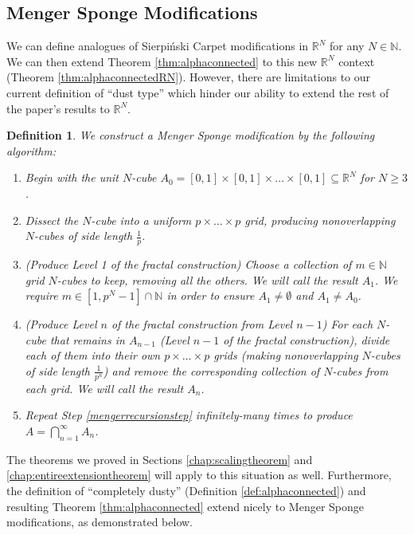 \documentclass{article}
\theoremstyle{plain}
\newtheorem{definition}{Definition}
\numberwithin{equation}{section}
\numberwithin{table}{section}
\numberwithin{figure}{section}
\newcommand{\vaddspace}[1]{\rule{0pt}{#1pt}}
\newcommand{\newparagraph}{\vaddspace{10}}
\begin{document}
\subsection{Menger Sponge Modifications} \label{chap:mengersponges}
We can define analogues of Sierpi\'nski Carpet modifications in $\mathbb{R}^N$ for any $N \in \mathbb{N}$. We can then extend Theorem \ref{thm:alphaconnected} to this new $\mathbb{R}^N$ context (Theorem \ref{thm:alphaconnectedRN}). However, there are limitations to our current definition of ``dust type'' which hinder our ability to extend the rest of the paper's results to $\mathbb{R}^N$.
\begin{definition}\label{def:mengerspongemodification}
We construct a \textit{Menger Sponge modification} by the following algorithm:
\begin{enumerate}
    \item Begin with the unit $N$-cube $A_0 = [0,1] \times [0,1] \times\dots\times [0,1] \subseteq \mathbb{R}^N$ for $N \geq 3$.
    \item Dissect the $N$-cube into a uniform $p \times\dots\times p$ grid, producing nonoverlapping $N$-cubes of side length $\frac{1}{p}$.
    \item (Produce Level 1 of the fractal construction) Choose a collection of $m \in \mathbb{N}$ grid $N$-cubes to keep, removing all the others. We will call the result $A_1$. We require $m \in [1,p^N-1] \cap \mathbb{N}$ in order to ensure $A_1 \neq \emptyset$ and $A_1 \neq A_0$.
    \item (Produce Level $n$ of the fractal construction from Level $n-1$) For each $N$-cube that remains in $A_{n-1}$ (Level $n-1$ of the fractal construction), divide each of them into their own $p \times\dots\times p$ grids (making nonoverlapping $N$-cubes of side length $\frac{1}{p^n}$) and remove the corresponding collection of $N$-cubes from each grid. We will call the result $A_n$. \label{mengerrecursionstep}
    \item Repeat Step \ref{mengerrecursionstep} infinitely-many times to produce $\displaystyle A = \bigcap_{n=1}^{\infty} A_n$.
\end{enumerate}
\end{definition}

The theorems we proved in Sections \ref{chap:scalingtheorem} and \ref{chap:entireextensiontheorem} will apply to this situation as well. Furthermore, the definition of ``completely dusty'' (Definition \ref{def:alphaconnected}) and resulting Theorem \ref{thm:alphaconnected} extend nicely to Menger Sponge modifications, as demonstrated below.
\newparagraph
\end{document}
